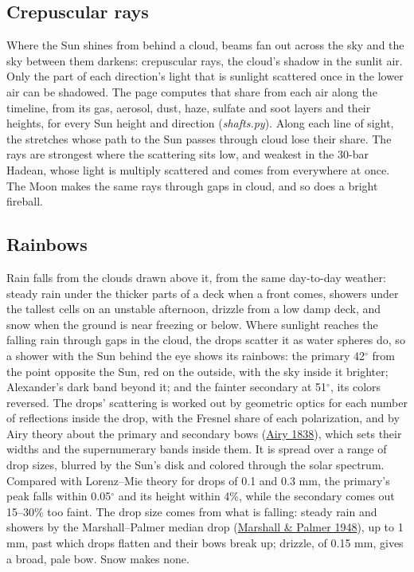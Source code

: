 \documentclass[9pt,twocolumn]{extarticle}
\begin{document}
\subsection{Crepuscular rays}\label{crepuscular-rays}

Where the Sun shines from behind a cloud, beams fan out across the sky and the sky between them darkens: crepuscular rays, the cloud's shadow in the sunlit air. Only the part of each direction's light that is sunlight scattered once in the lower air can be shadowed. The page computes that share from each air along the timeline, from its gas, aerosol, dust, haze, sulfate and soot layers and their heights, for every Sun height and direction (\emph{shafts.py}). Along each line of sight, the stretches whose path to the Sun passes through cloud lose their share. The rays are strongest where the scattering sits low, and weakest in the 30-bar Hadean, whose light is multiply scattered and comes from everywhere at once. The Moon makes the same rays through gaps in cloud, and so does a bright fireball.


\subsection{Rainbows}\label{rainbows}

Rain falls from the clouds drawn above it, from the same day-to-day weather: steady rain under the thicker parts of a deck when a front comes, showers under the tallest cells on an unstable afternoon, drizzle from a low damp deck, and snow when the ground is near freezing or below. Where sunlight reaches the falling rain through gaps in the cloud, the drops scatter it as water spheres do, so a shower with the Sun behind the eye shows its rainbows: the primary 42$^\circ$ from the point opposite the Sun, red on the outside, with the sky inside it brighter; Alexander's dark band beyond it; and the fainter secondary at 51$^\circ$, its colors reversed. The drops' scattering is worked out by geometric optics for each number of reflections inside the drop, with the Fresnel share of each polarization, and by Airy theory about the primary and secondary bows (\protect\hyperlink{cite.airy1838}{Airy 1838}), which sets their widths and the supernumerary bands inside them. It is spread over a range of drop sizes, blurred by the Sun's disk and colored through the solar spectrum. Compared with Lorenz--Mie theory for drops of 0.1 and 0.3 mm, the primary's peak falls within 0.05$^\circ$ and its height within 4\%, while the secondary comes out 15--30\% too faint. The drop size comes from what is falling: steady rain and showers by the Marshall--Palmer median drop (\protect\hyperlink{cite.marshall1948}{Marshall \& Palmer 1948}), up to 1 mm, past which drops flatten and their bows break up; drizzle, of 0.15 mm, gives a broad, pale bow. Snow makes none.
\end{document}
